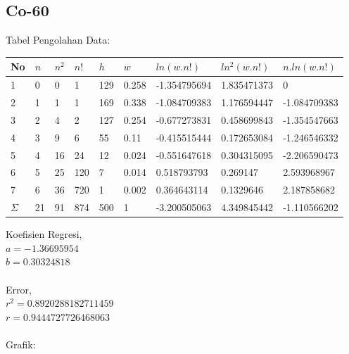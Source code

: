 \documentclass{article}
\begin{document}
			\subsection{Co-60}
			Tabel Pengolahan Data: 
			\begin{longtable}{@{}lllllllll@{}}
				\toprule
				No  & $n$  & $n^{2}$ & $n!$   & $h$   & $w$     & $ln(w.n!)$     & $ln^{2}(w.n!)$ & $n.ln(w.n!)$   \\ \midrule
				\endfirsthead
				\endhead
				\bottomrule
				\endfoot
				\endlastfoot
				1   & 0  & 0                    & 1   & 129 & 0.258 & -1.354795694 & 1.835471373                 & 0            \\
				2   & 1  & 1                    & 1   & 169 & 0.338 & -1.084709383 & 1.176594447                 & -1.084709383 \\
				3   & 2  & 4                    & 2   & 127 & 0.254 & -0.677273831 & 0.458699843                 & -1.354547663 \\
				4   & 3  & 9                    & 6   & 55  & 0.11  & -0.415515444 & 0.172653084                 & -1.246546332 \\
				5   & 4  & 16                   & 24  & 12  & 0.024 & -0.551647618 & 0.304315095                 & -2.206590473 \\
				6   & 5  & 25                   & 120 & 7   & 0.014 & 0.518793793  & 0.269147                    & 2.593968967  \\
				7   & 6  & 36                   & 720 & 1   & 0.002 & 0.364643114  & 0.1329646                   & 2.187858682  \\* \midrule
				$\Sigma$ & 21 & 91                   & 874 & 500 & 1     & -3.200505063 & 4.349845442                 & -1.110566202 \\* \bottomrule
			\end{longtable}
			\hspace{-0.6cm}Koefisien Regresi, \\
			$a = -1.36695954$ \\
			$b = 0.30324818$ \\ \\
			Error,\\
			$r^{2} = 0.8920288182711459$ \\
			$r = 0.9444727726468063$ \\ \\
			Grafik: 
\end{document}
